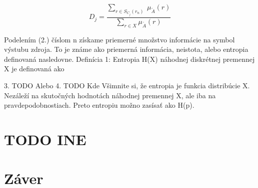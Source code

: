 \begin{equation}\label{fuzzy}
D_j = \frac{ \sum\limits_{r \in S_{C_{j}}(r_n)  } \: \mu_{\tilde{A}} (r) }{\sum\limits_{r \in X  } \mu_{\tilde{A}} (r) }
\end{equation}




Podelením (2.) číslom n získame priemerné množstvo informácie na symbol výstubu zdroja. To je známe ako priemerná informácia, neistota, alebo entropia definovaná nasledovne.
Definícia 1:  Entropia H(X) náhodnej diskrétnej premennej X je definovaná ako 

3. TODO
Alebo
4.	TODO
Kde
Všimnite si, že entropia je funkcia distribúcie X. Nezáleží na skutočných hodnotách náhodnej premennej X, ale iba na pravdepodobnostiach. Preto entropiu možno zasísať ako H(p).


\section{TODO INE }

\section{Záver}